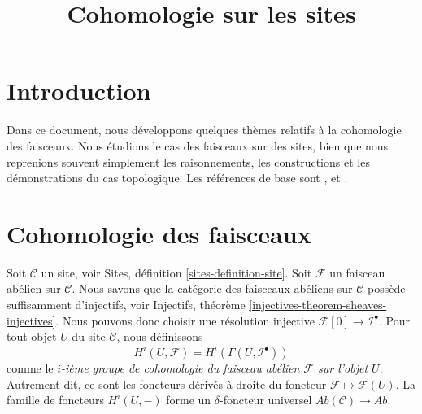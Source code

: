 

%


\title{Cohomologie sur les sites}


\maketitle

\label{section-phantom}

\tableofcontents

\section{Introduction}
\label{section-introduction}

\noindent
Dans ce document, nous développons quelques thèmes relatifs à la cohomologie
des faisceaux. Nous étudions le cas des faisceaux sur des sites,
bien que nous reprenions souvent simplement les raisonnements,
les constructions et les démonstrations du cas
topologique.
Les références de base sont \cite{SGA4}, \cite{Godement} et \cite{Iversen}.




\section{Cohomologie des faisceaux}
\label{section-cohomology-sheaves}

\noindent
Soit $\mathcal{C}$ un site, voir
Sites, définition \ref{sites-definition-site}.
Soit $\mathcal{F}$ un faisceau abélien sur $\mathcal{C}$.
Nous savons que la catégorie des faisceaux abéliens sur $\mathcal{C}$
possède suffisamment d'injectifs, voir
Injectifs, théorème \ref{injectives-theorem-sheaves-injectives}.
Nous pouvons donc choisir une résolution injective
$\mathcal{F}[0] \to \mathcal{I}^\bullet$.
Pour tout objet $U$ du site $\mathcal{C}$, nous définissons
\begin{equation}
\label{equation-cohomology-object-site}
H^i(U, \mathcal{F}) = H^i(\Gamma(U, \mathcal{I}^\bullet))
\end{equation}
comme le {\it $i$-ième groupe de cohomologie du faisceau abélien
$\mathcal{F}$ sur l'objet $U$}. Autrement dit, ce sont les
foncteurs dérivés à droite du foncteur $\mathcal{F} \mapsto \mathcal{F}(U)$.
La famille de foncteurs $H^i(U, -)$ forme un $\delta$-foncteur universel
$\textit{Ab}(\mathcal{C}) \to \textit{Ab}$.

